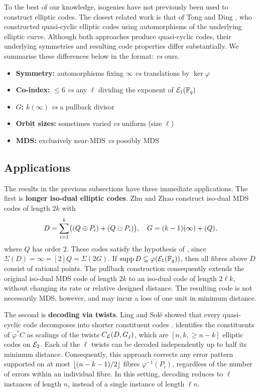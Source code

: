 \documentclass[twocolumn, 11pt]{scrartcl}
\begin{document}
To the best of our knowledge, isogenies have not previously been used to construct elliptic codes. The closest related work is that of Tong and Ding \cite{tong2013quasicyclic}, who constructed quasi-cyclic elliptic codes using automorphisms of the underlying elliptic curve. Although both approaches produce quasi-cyclic codes, their underlying symmetries and resulting code properties differ substantially. We summarise these differences below in the format: \cite{tong2013quasicyclic} \textit{vs} ours.
\begin{itemize}
    \item \textbf{Symmetry:} automorphisms fixing $\infty$ \textit{vs} translations by $\ker\varphi$
    \item \textbf{Co-index:} $\leq 6$ \textit{vs} any $\ell$ dividing the exponent of $\mcE_1(\bbF_q)$
    \item \textbf{$G$:} $k(\infty)$ \textit{vs} a pullback divisor
    \item \textbf{Orbit sizes:} sometimes varied \textit{vs} uniform (size $\ell$)
    \item \textbf{MDS:} exclusively near-MDS \textit{vs} possibly MDS
\end{itemize}

\subsection{Applications}

The results in the previous subsections have three immediate applications. The first is \textbf{longer iso-dual elliptic codes}. Zhu and Zhao \cite[Constr.~1]{zhu2026isodual} construct iso-dual MDS codes of length $2k$ with
\[ D=\sum_{i=1}^k\pa[\big]{(Q\oplus P_i)+(Q\ominus P_i)},\quad G=(k-1)(\infty)+(Q),\]
where $Q$ has order 2. These codes satisfy the hypothesis of , since $\Sigma(D)=\infty=[2]Q=\Sigma(2G)$. If $\supp D\subseteq\varphi(\mcE_1(\bbF_q))$, then all fibres above $D$ consist of rational points. The pullback construction consequently extends the original iso-dual MDS code of length $2k$ to an iso-dual code of length $2\ell k$, without changing its rate or relative designed distance. The resulting code is not necessarily MDS, however, and may incur a loss of one unit in minimum distance.

The second is \textbf{decoding via twists}. Ling and Sol\'e showed that every quasi-cyclic code decomposes into shorter constituent codes \cite{ling2001algebraic}.  identifies the constituents of $\varphi^*C$ as scalings of the twists $C_\mcL(D,G_j)$, which are $[n,k,\geq\! n-k]$ elliptic codes on $\mcE_2$. Each of the $\ell$ twists can be decoded independently up to half its minimum distance. Consequently, this approach corrects any error pattern supported on at most $\floor{(n-k-1)/2}$ fibres $\varphi^{-1}(P_i)$, regardless of the number of errors within an individual fibre. In this setting, decoding reduces to $\ell$ instances of length $n$, instead of a single instance of length $\ell n$.
\end{document}
